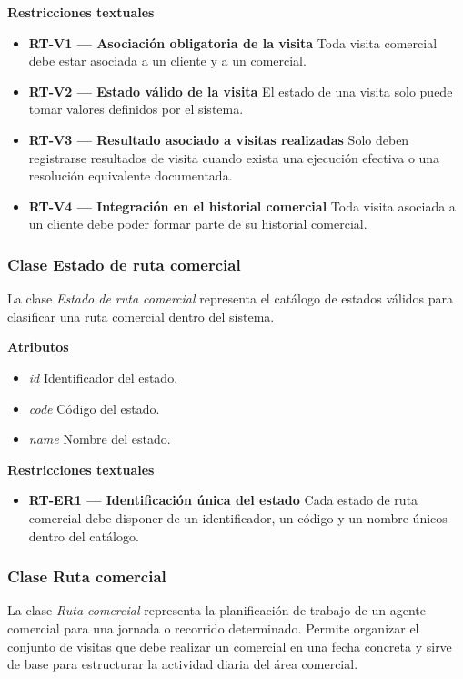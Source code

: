 \textbf{Restricciones textuales}

\begin{itemize}
      \item \textbf{RT-V1 — Asociación obligatoria de la visita} Toda visita comercial debe estar asociada a un cliente y a un comercial.
      \item \textbf{RT-V2 — Estado válido de la visita} El estado de una visita solo puede tomar valores definidos por el sistema.
      \item \textbf{RT-V3 — Resultado asociado a visitas realizadas} Solo deben registrarse resultados de visita cuando exista una ejecución efectiva o una resolución equivalente documentada.
      \item \textbf{RT-V4 — Integración en el historial comercial} Toda visita asociada a un cliente debe poder formar parte de su historial comercial.
\end{itemize}

\subsubsection{Clase Estado de ruta comercial}

La clase \textit{Estado de ruta comercial} representa el catálogo de estados válidos para clasificar una ruta comercial dentro del sistema.

\textbf{Atributos}

\begin{itemize}
      \item \textit{id} Identificador del estado.
      \item \textit{code} Código del estado.
      \item \textit{name} Nombre del estado.
\end{itemize}

\textbf{Restricciones textuales}

\begin{itemize}
      \item \textbf{RT-ER1 — Identificación única del estado} Cada estado de ruta comercial debe disponer de un identificador, un código y un nombre únicos dentro del catálogo.
\end{itemize}

\subsubsection{Clase Ruta comercial}

La clase \textit{Ruta comercial} representa la planificación de trabajo de un agente comercial para una jornada o recorrido determinado. Permite organizar el conjunto de visitas que debe realizar un comercial en una fecha concreta y sirve de base para estructurar la actividad diaria del área comercial.

